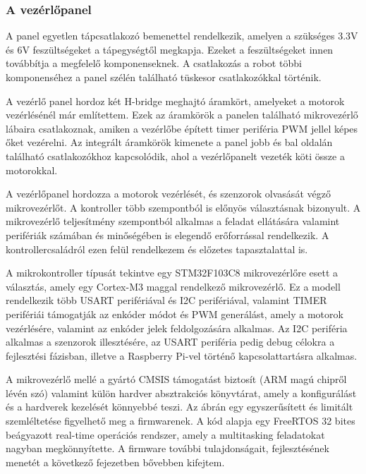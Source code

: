 \subsubsection{A vezérlőpanel}

A panel egyetlen tápcsatlakozó bemenettel rendelkezik, amelyen a szükséges 3.3V
és 6V feszültségeket a tápegységtől megkapja. Ezeket a feszültségeket innen
továbbítja a megfelelő komponenseknek. A csatlakozás a robot többi komponenséhez
a panel szélén található tüskesor csatlakozókkal történik.

\medskip

A vezérlő panel hordoz két H-bridge meghajtó áramkört, amelyeket a motorok
vezérlésénél már említettem. Ezek az áramkörök a panelen található mikrovezérlő
lábaira csatlakoznak, amiken a vezérlőbe épített timer periféria PWM jellel képes
őket vezérelni. Az integrált áramkörök kimenete a panel jobb és bal oldalán
található csatlakozókhoz kapcsolódik, ahol a vezérlőpanelt vezeték köti össze a
motorokkal.

\medskip

A vezérlőpanel hordozza a motorok vezérlését, és szenzorok olvasását végző
mikrovezérlőt. A kontroller több szempontból is előnyös választásnak bizonyult. A
mikrovezérlő teljesítmény szempontból alkalmas a feladat ellátására valamint
perifériák számában és minőségében is elegendő erőforrással rendelkezik. A
kontrollercsaládról ezen felül rendelkezem és előzetes tapasztalattal is.

A mikrokontroller típusát tekintve egy STM32F103C8 mikrovezérlőre esett a
választás, amely egy Cortex-M3 maggal rendelkező mikrovezérlő. Ez a modell
rendelkezik több USART perifériával és I2C perifériával, valamint TIMER
perifériái támogatják az enkóder módot és PWM generálást, amely a motorok
vezérlésére, valamint az enkóder jelek feldolgozására alkalmas. Az I2C periféria
alkalmas a szenzorok illesztésére, az USART periféria pedig debug célokra a
fejlesztési fázisban, illetve a Raspberry Pi-vel történő kapcsolattartásra
alkalmas.

A mikrovezérlő mellé a gyártó CMSIS támogatást biztosít (ARM magú chipről lévén
szó) valamint külön hardver absztrakciós könyvtárat, amely a konfigurálást és a
hardverek kezelését könnyebbé teszi. Az ábrán egy egyszerűsített és limitált
szemléltetése figyelhető meg a firmwarenek. A kód alapja egy FreeRTOS 32 bites
beágyazott real-time operációs rendszer, amely a multitasking feladatokat nagyban
megkönnyítette. A firmware további tulajdonságait, fejlesztésének menetét a
következő fejezetben bővebben kifejtem.

